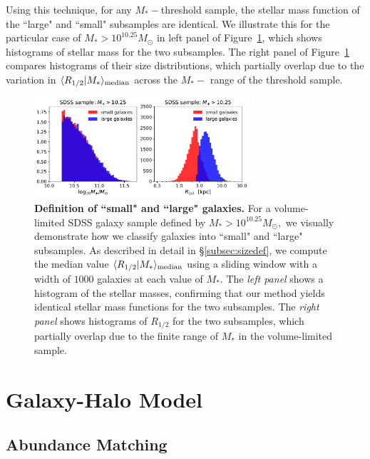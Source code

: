 \documentclass[usenatbib,usegraphicx,letterpaper]{mn2e}
\newcommand{\rhalf}{R_{1/2}}
\newcommand{\mstar}{M_{\ast}}
\newcommand{\median}[2]{\langle{#1}\vert{#2}\rangle_{\rm median}}
\newcommand{\msun}{M_\odot}
\begin{document}
Using this technique, for any $\mstar-$threshold sample, the stellar mass function of the ``large" and ``small" subsamples are identical. We illustrate this for the particular case of $\mstar>10^{10.25}\msun$ in left panel of Figure~\ref{fig:sizedefinition}, which shows histograms of stellar mass for the two subsamples. The right panel of Figure~\ref{fig:sizedefinition} compares histograms of their size distributions, which partially overlap due to the variation in $\median{\rhalf}{\mstar}$ across the $\mstar-$ range of the threshold sample. 


\begin{figure}
\centering
\includegraphics[width=8cm]{FIGS/sdss_small_large_sample_definitions.pdf}
\caption{
{\bf Definition of ``small" and ``large" galaxies.} For a volume-limited SDSS galaxy sample defined by $M_{\ast}>10^{10.25}M_{\odot},$ we visually demonstrate how we classify galaxies into ``small" and ``large" subsamples. As described in detail in \S\ref{subsec:sizedef}, we compute the median value $\median{\rhalf}{\mstar}$ using a sliding window with a width of $1000$ galaxies at each value of $\mstar.$ The {\em left panel} shows a histogram of the stellar masses, confirming that our method yields identical stellar mass functions for the two subsamples. The {\em right panel} shows histograms of $\rhalf$ for the two subsamples, which partially overlap due to the finite range of $\mstar$ in the volume-limited sample.
}
\label{fig:sizedefinition}
\end{figure}

\section{Galaxy-Halo Model}
\label{sec:model}

\subsection{Abundance Matching}
\label{subsec:sham}
\end{document}
